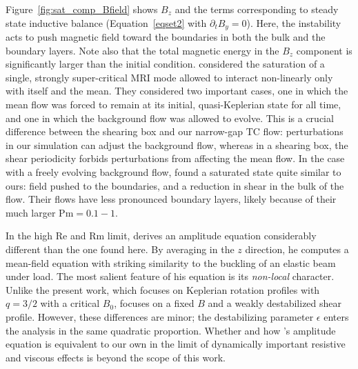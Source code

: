 \documentclass{emulateapj}
\newcommand\reye{\mathrm{Re}}
\newcommand\reym{\mathrm{Rm}}
\newcommand{\Pm}{\mathrm{Pm}}
\begin{document}
Figure~\ref{fig:sat_comp_Bfield} shows $B_z$ and the terms corresponding to steady state inductive balance (Equation~\ref{eqset2} with $\partial_t B_{y} = 0$). Here, the instability acts to push magnetic field toward the boundaries in both the bulk and the boundary layers. Note also that the total magnetic energy in the $B_z$ component is significantly larger than the initial condition. \citet{Ebrahimi:2009ey} considered the saturation of a single, strongly super-critical MRI mode allowed to interact non-linearly only with itself and the mean. They considered two important cases, one in which the mean flow was forced to remain at its initial, quasi-Keplerian state for all time, and one in which the background flow was allowed to evolve. This is a crucial difference between the shearing box and our narrow-gap TC flow: perturbations in our simulation can adjust the background flow, whereas in a shearing box, the shear periodicity forbids perturbations from affecting the mean flow. In the case with a freely evolving background flow, \citet{Ebrahimi:2009ey} found a saturated state quite similar to ours: field pushed to the boundaries, and a reduction in shear in the bulk of the flow. Their flows have less pronounced boundary layers, likely because of their much larger $\Pm = 0.1 -1$. 

In the high $\reye$ and  $\reym$  limit, \citet{Vasil:2015} derives an amplitude equation considerably different than the one found here. By averaging in the $z$ direction, he computes a mean-field equation with striking similarity to the buckling of an elastic beam under load. The most salient feature of his equation is its \emph{non-local} character. Unlike the present work, which focuses on Keplerian rotation profiles with $q = 3/2$ with a critical $B_0$, \citet{Vasil:2015} focuses on a fixed $B$ and a weakly destabilized shear profile. However, these differences are minor; the destabilizing parameter $\epsilon$ enters the analysis in the same quadratic proportion. Whether and how \citet{Vasil:2015}'s amplitude equation is equivalent to our own in the limit of dynamically important resistive and viscous effects is beyond the scope of this work. 
\end{document}
